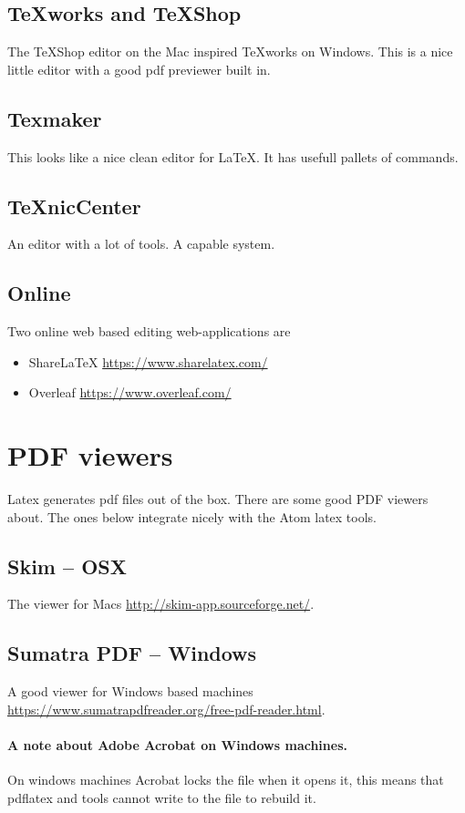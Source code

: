 \subsection{TeXworks and TeXShop}
The TeXShop editor on the Mac inspired TeXworks on Windows.  This is a nice little editor with a good pdf previewer built in.

\subsection{Texmaker}
    This looks like a nice clean editor for LaTeX.  It has  usefull pallets of commands.
\subsection{TeXnicCenter}
    An editor with a lot of tools.
    A  capable system.
\subsection{Online}
Two online web based editing web-applications are
\begin{itemize}
  \item ShareLaTeX \url{https://www.sharelatex.com/}
  \item Overleaf  \url{https://www.overleaf.com/}
\end{itemize}

\section{PDF viewers}
Latex generates pdf files out of the box.  There are some good PDF viewers about.  The ones below integrate nicely with the Atom latex tools.
\subsection{Skim -- OSX}
The viewer for Macs \url{http://skim-app.sourceforge.net/}.
\subsection{Sumatra PDF -- Windows}
A good viewer for Windows based machines\\ \url{https://www.sumatrapdfreader.org/free-pdf-reader.html}.

\paragraph{A note about Adobe Acrobat on  Windows machines.}
On windows machines Acrobat locks the file when it opens it, this means that pdflatex and tools cannot write to the file to rebuild it.

